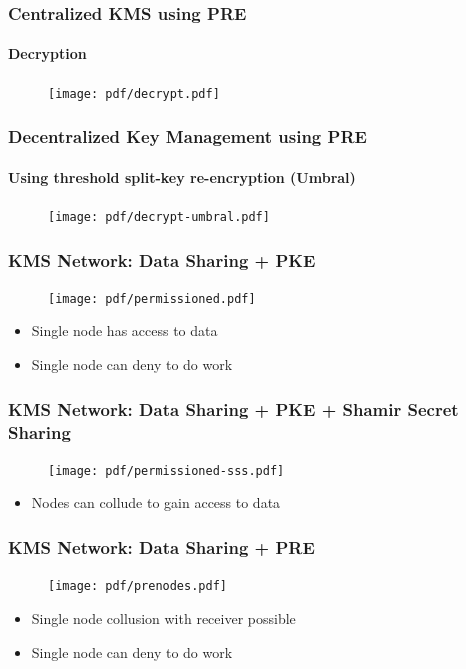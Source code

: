 \documentclass[xetex,mathsans,sans,aspectratio=169]{beamer}
\begin{document}
    \begin{frame}
        \frametitle{Centralized KMS using PRE}
        \framesubtitle{Decryption}
        \begin{figure}
            \centering
            \texttt{[image: pdf/decrypt.pdf]}
        \end{figure}
    \end{frame}

    \begin{frame}
        \frametitle{Decentralized Key Management using PRE}
        \framesubtitle{Using threshold split-key re-encryption (Umbral)}
        \begin{figure}
            \centering
            \texttt{[image: pdf/decrypt-umbral.pdf]}
        \end{figure}
    \end{frame}

    \begin{frame}
        \frametitle{KMS Network: Data Sharing + PKE}
        \begin{figure}
            \centering
            \texttt{[image: pdf/permissioned.pdf]}
        \end{figure}
        \begin{itemize}
            \item Single node has access to data
            \item Single node can deny to do work
        \end{itemize}
    \end{frame}

    \begin{frame}
        \frametitle{KMS Network: Data Sharing + PKE + Shamir Secret Sharing}
        \begin{figure}
            \centering
            \texttt{[image: pdf/permissioned-sss.pdf]}
        \end{figure}
        \begin{itemize}
            \item Nodes can collude to gain access to data
        \end{itemize}
    \end{frame}

    \begin{frame}
        \frametitle{KMS Network: Data Sharing + PRE}
        \begin{figure}
            \centering
            \texttt{[image: pdf/prenodes.pdf]}
        \end{figure}
        \begin{itemize}
            \item Single node collusion with receiver possible
            \item Single node can deny to do work
        \end{itemize}
    \end{frame}
\end{document}
